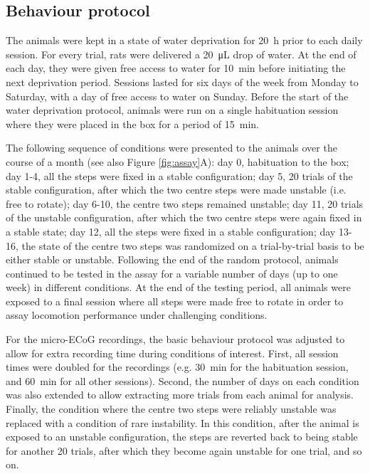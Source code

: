 \subsection{Behaviour protocol}

The animals were kept in a state of water deprivation for \SI{20}{\hour} prior to each daily session. For every trial, rats were delivered a \SI{20}{\micro\liter} drop of water. At the end of each day, they were given free access to water for \SI{10}{\minute} before initiating the next deprivation period. Sessions lasted for six days of the week from Monday to Saturday, with a day of free access to water on Sunday. Before the start of the water deprivation protocol, animals were run on a single habituation session where they were placed in the box for a period of \SI{15}{\minute}.

The following sequence of conditions were presented to the animals over the course of a month (see also Figure \ref{fig:assay}A): day 0, habituation to the box; day 1-4, all the steps were fixed in a stable configuration; day 5, 20 trials of the stable configuration, after which the two centre steps were made unstable (i.e. free to rotate); day 6-10, the centre two steps remained unstable; day 11, 20 trials of the unstable configuration, after which the two centre steps were again fixed in a stable state; day 12, all the steps were fixed in a stable configuration; day 13-16, the state of the centre two steps was randomized on a trial-by-trial basis to be either stable or unstable. Following the end of the random protocol, animals continued to be tested in the assay for a variable number of days (up to one week) in different conditions. At the end of the testing period, all animals were exposed to a final session where all steps were made free to rotate in order to assay locomotion performance under challenging conditions.

For the micro-ECoG recordings, the basic behaviour protocol was adjusted to allow for extra recording time during conditions of interest. First, all session times were doubled for the recordings (e.g. \SI{30}{\minute} for the habituation session, and \SI{60}{\minute} for all other sessions). Second, the number of days on each condition was also extended to allow extracting more trials from each animal for analysis. Finally, the condition where the centre two steps were reliably unstable was replaced with a condition of rare instability. In this condition, after the animal is exposed to an unstable configuration, the steps are reverted back to being stable for another 20 trials, after which they become again unstable for one trial, and so on.

